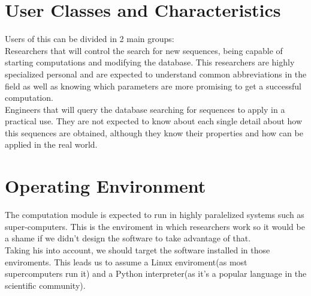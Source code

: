 \documentclass{scrreprt}
\begin{document}
\section{User Classes and Characteristics}

Users of this can be divided in 2 main groups:\\

Researchers that will control the search for new sequences, being capable of
starting computations and modifying the database. This researchers are highly
specialized personal and are expected to understand common abbreviations in
the field as well as knowing which parameters are more promising to get a
successful computation.\\

Engineers that will query the database searching for sequences to apply in
a practical use. They are not expected to know about each single detail about
how this sequences are obtained, although they know their properties and how
can be applied in the real world.\\

\section{Operating Environment}

The computation module is expected to run in highly paralelized systems such
as super-computers. This is the enviroment in which researchers work so it
would be a shame if we didn't design the software to take advantage of
that.\\

Taking his into account, we should target the software installed in those
enviroments. This leads us to assume a Linux enviroment(as most supercomputers
run it) and a Python interpreter(as it's a popular language in the scientific
community).\\


\end{document}
